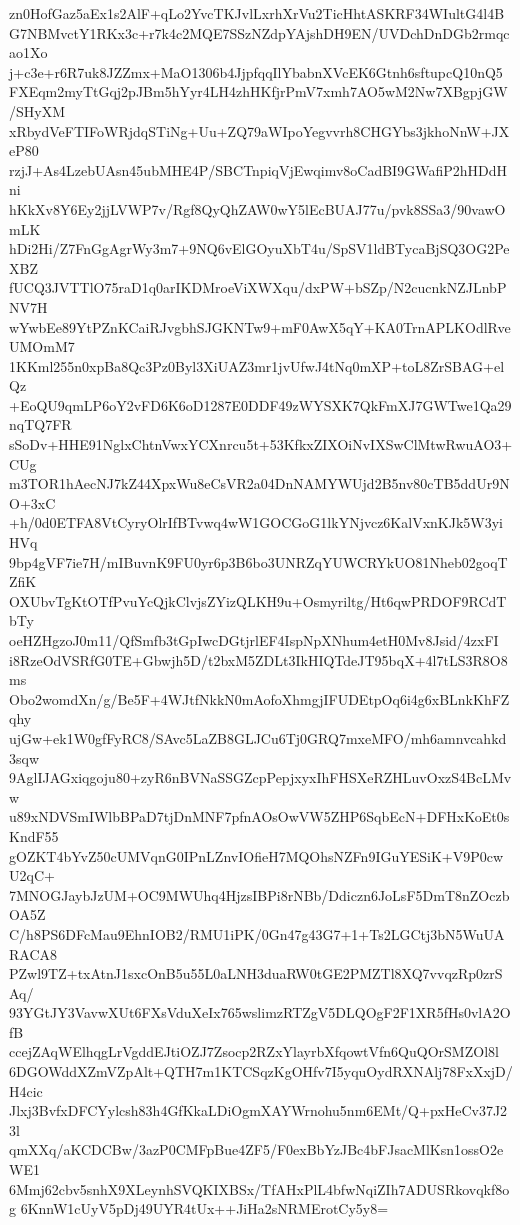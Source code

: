 zn0HofGaz5aEx1s2AlF+qLo2YvcTKJvlLxrhXrVu2TicHhtASKRF34WIultG4l4B
G7NBMvctY1RKx3c+r7k4c2MQE7SSzNZdpYAjshDH9EN/UVDchDnDGb2rmqcao1Xo
j+c3e+r6R7uk8JZZmx+MaO1306b4JjpfqqIlYbabnXVcEK6Gtnh6sftupcQ10nQ5
FXEqm2myTtGqj2pJBm5hYyr4LH4zhHKfjrPmV7xmh7AO5wM2Nw7XBgpjGW/SHyXM
xRbydVeFTIFoWRjdqSTiNg+Uu+ZQ79aWIpoYegvvrh8CHGYbs3jkhoNnW+JXeP80
rzjJ+As4LzebUAsn45ubMHE4P/SBCTnpiqVjEwqimv8oCadBI9GWafiP2hHDdHni
hKkXv8Y6Ey2jjLVWP7v/Rgf8QyQhZAW0wY5lEcBUAJ77u/pvk8SSa3/90vawOmLK
hDi2Hi/Z7FnGgAgrWy3m7+9NQ6vElGOyuXbT4u/SpSV1ldBTycaBjSQ3OG2PeXBZ
fUCQ3JVTTlO75raD1q0arIKDMroeViXWXqu/dxPW+bSZp/N2cucnkNZJLnbPNV7H
wYwbEe89YtPZnKCaiRJvgbhSJGKNTw9+mF0AwX5qY+KA0TrnAPLKOdlRveUMOmM7
1KKml255n0xpBa8Qc3Pz0Byl3XiUAZ3mr1jvUfwJ4tNq0mXP+toL8ZrSBAG+elQz
+EoQU9qmLP6oY2vFD6K6oD1287E0DDF49zWYSXK7QkFmXJ7GWTwe1Qa29nqTQ7FR
sSoDv+HHE91NglxChtnVwxYCXnrcu5t+53KfkxZIXOiNvIXSwClMtwRwuAO3+CUg
m3TOR1hAecNJ7kZ44XpxWu8eCsVR2a04DnNAMYWUjd2B5nv80cTB5ddUr9NO+3xC
+h/0d0ETFA8VtCyryOlrIfBTvwq4wW1GOCGoG1lkYNjvcz6KalVxnKJk5W3yiHVq
9bp4gVF7ie7H/mIBuvnK9FU0yr6p3B6bo3UNRZqYUWCRYkUO81Nheb02goqTZfiK
OXUbvTgKtOTfPvuYcQjkClvjsZYizQLKH9u+Osmyriltg/Ht6qwPRDOF9RCdTbTy
oeHZHgzoJ0m11/QfSmfb3tGpIwcDGtjrlEF4IspNpXNhum4etH0Mv8Jsid/4zxFI
i8RzeOdVSRfG0TE+Gbwjh5D/t2bxM5ZDLt3IkHIQTdeJT95bqX+4l7tLS3R8O8ms
Obo2womdXn/g/Be5F+4WJtfNkkN0mAofoXhmgjIFUDEtpOq6i4g6xBLnkKhFZqhy
ujGw+ek1W0gfFyRC8/SAvc5LaZB8GLJCu6Tj0GRQ7mxeMFO/mh6amnvcahkd3sqw
9AglIJAGxiqgoju80+zyR6nBVNaSSGZcpPepjxyxIhFHSXeRZHLuvOxzS4BcLMvw
u89xNDVSmIWlbBPaD7tjDnMNF7pfnAOsOwVW5ZHP6SqbEcN+DFHxKoEt0sKndF55
gOZKT4bYvZ50cUMVqnG0IPnLZnvIOfieH7MQOhsNZFn9IGuYESiK+V9P0cwU2qC+
7MNOGJaybJzUM+OC9MWUhq4HjzsIBPi8rNBb/Ddiczn6JoLsF5DmT8nZOczbOA5Z
C/h8PS6DFcMau9EhnIOB2/RMU1iPK/0Gn47g43G7+1+Ts2LGCtj3bN5WuUARACA8
PZwl9TZ+txAtnJ1sxcOnB5u55L0aLNH3duaRW0tGE2PMZTl8XQ7vvqzRp0zrSAq/
93YGtJY3VavwXUt6FXsVduXeIx765wslimzRTZgV5DLQOgF2F1XR5fHs0vlA2OfB
ccejZAqWElhqgLrVgddEJtiOZJ7Zsocp2RZxYlayrbXfqowtVfn6QuQOrSMZOl8l
6DGOWddXZmVZpAlt+QTH7m1KTCSqzKgOHfv7I5yquOydRXNAlj78FxXxjD/H4cic
Jlxj3BvfxDFCYylcsh83h4GfKkaLDiOgmXAYWrnohu5nm6EMt/Q+pxHeCv37J23l
qmXXq/aKCDCBw/3azP0CMFpBue4ZF5/F0exBbYzJBc4bFJsacMlKsn1ossO2eWE1
6Mmj62cbv5snhX9XLeynhSVQKIXBSx/TfAHxPlL4bfwNqiZIh7ADUSRkovqkf8og
6KnnW1cUyV5pDj49UYR4tUx++JiHa2sNRMErotCy5y8=
